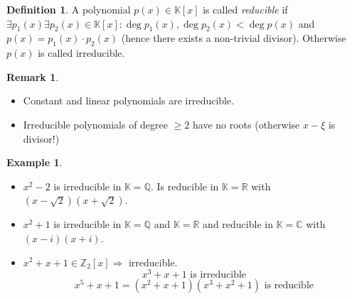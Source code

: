 \documentclass[a4paper,landscape,twocolumn]{article}
\theoremstyle{definition}
\newtheorem{defi}{Definition}
\newtheorem{ex}{Example}
\newtheorem{rem}{Remark}
\begin{document}
\begin{defi}
  \label{defi-9.23}
  A polynomial $p(x) \in \mathbb K[x]$ is called \emph{reducible}
  if $\exists p_1(x) \exists p_2(x) \in \mathbb K[x]: \deg{p_1(x)}, \deg{p_2(x)} < \deg{p(x)}$
  and $p(x) = p_1(x) \cdot p_2(x)$ (hence there exists a non-trivial divisor). %
  Otherwise $p(x)$ is called irreducible.
\end{defi}

\begin{rem}
  \label{bem-9.24}
  \begin{itemize}
    \item Constant and linear polynomials are irreducible.
    \item Irreducible polynomials of degree $\geq 2$ have no roots
      (otherwise $x - \xi$ is divisor!)
  \end{itemize}
\end{rem}

\begin{ex} \hfill{}
  \begin{itemize}
    \item $x^2-2$ is irreducible in $\mathbb K = \mathbb Q$.
      Is reducible in $\mathbb K = \mathbb R$ with $(x - \sqrt{2})(x + \sqrt{2})$.
    \item $x^2 + 1$ is irreducible in $\mathbb K = \mathbb Q$ and $\mathbb K = \mathbb R$
      and reducible in $\mathbb K = \mathbb C$ with $(x - i)(x + i)$.
    \item $x^2 + x + 1 \in \mathbb Z_2[x] \Rightarrow$ irreducible.
      \[ x^3 + x + 1 \text{ is irreducible} \]
      \[ x^5 + x + 1 = (x^2 + x + 1)(x^3 + x^2 + 1) \text{ is reducible} \]
  \end{itemize}
\end{ex}
\end{document}
